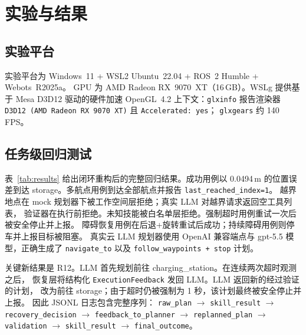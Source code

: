 \documentclass[10pt,twocolumn]{ctexart}
\begin{document}
\section{实验与结果}
\label{sec:exp}

\subsection{实验平台}
实验平台为 Windows~11 + WSL2 Ubuntu~22.04 + ROS~2 Humble + Webots~R2025a。
GPU 为 AMD Radeon RX~9070~XT（16\,GB）。WSLg 提供基于 Mesa D3D12 驱动的硬件加速
OpenGL~4.2 上下文：\texttt{glxinfo} 报告渲染器
\texttt{D3D12 (AMD Radeon RX 9070 XT)} 且 \texttt{Accelerated: yes}；
\texttt{glxgears} 约 140\,FPS。

\subsection{任务级回归测试}
表~\ref{tab:results} 给出闭环重构后的完整回归结果。成功用例以 0.0494\,m 的位置误差到达
storage。多航点用例到达全部航点并报告 \texttt{last\_reached\_index=1}。
越界地点在 mock 规划器下被工作空间层拒绝；真实 LLM 对越界请求返回空工具列表，
验证器在执行前拒绝。未知技能被白名单层拒绝。强制超时用例重试一次后被安全停止并上报。
障碍恢复用例在后退+旋转重试后成功；持续障碍用例则停车并上报目标被阻塞。
真实云 LLM 规划器使用 OpenAI 兼容端点与 gpt-5.5 模型，正确生成了
\texttt{navigate\_to} 以及 \texttt{follow\_waypoints + stop} 计划。

关键新结果是 R12。LLM 首先规划前往 charging\_station。在连续两次超时观测之后，
恢复层将结构化 \texttt{ExecutionFeedback} 发回 LLM。LLM 返回新的经过验证的计划，
改为前往 storage；由于超时仍被强制为 1 秒，该计划最终被安全停止并上报。
因此 JSONL 日志包含完整序列：
\texttt{raw\_plan} $\rightarrow$ \texttt{skill\_result} $\rightarrow$
\texttt{recovery\_decision} $\rightarrow$ \texttt{feedback\_to\_planner}
$\rightarrow$ \texttt{replanned\_plan} $\rightarrow$ \texttt{validation}
$\rightarrow$ \texttt{skill\_result} $\rightarrow$ \texttt{final\_outcome}。
\end{document}
